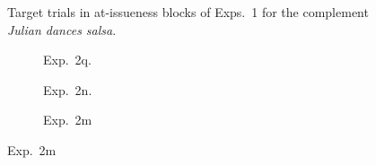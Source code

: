 \documentclass[11pt,fleqn]{article}
\newcommand{\6}{\mbox{$[\hspace*{-.6mm}[$}}
\newcommand{\9}{\mbox{$]\hspace*{-.6mm}]$}}
\begin{document}
\begin{figure}[h!]
\caption{Target trials in at-issueness blocks of Exps.~1 for the complement {\em Julian dances salsa}.}\label{fig:ai-exps1}
\end{figure}

\begin{figure}[h!]
\centering

\begin{subfigure}[t]{0.5\textwidth}
        \centering
{}
\caption{Exp.~2q.}
\end{subfigure}%
\begin{subfigure}[t]{0.5\textwidth}
\centering
{} 
\caption{Exp.~2n.}
 \end{subfigure}
\begin{subfigure}[t]{0.5\textwidth}
        \centering
{}
\caption{Exp.~2m}
 \end{subfigure}%

\end{figure}
\end{document}
